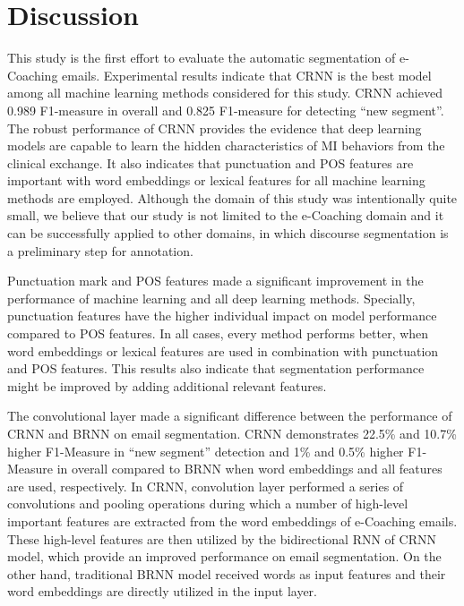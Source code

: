 \documentclass{amia}
\begin{document}
\section*{Discussion}
This study is the first effort to evaluate the automatic segmentation of e-Coaching emails. Experimental results indicate that CRNN is the best model among all machine learning methods considered for this study. CRNN achieved 0.989 F1-measure in overall and 0.825 F1-measure for detecting ``new segment''. The robust performance of CRNN provides the evidence that deep learning models are capable to learn the hidden characteristics of MI behaviors from the clinical exchange. It also indicates that punctuation and POS features are important with word embeddings or lexical features for all machine learning methods are employed. Although the domain of this study was intentionally quite small, we believe that our study is not limited to the e-Coaching domain and it can be successfully applied to other domains, in which discourse segmentation is a preliminary step for annotation.

Punctuation mark and POS features made a significant improvement in the performance of machine learning and all deep learning methods. Specially, punctuation features have the higher individual impact on model performance compared to POS features. In all cases, every method performs better, when word embeddings or lexical features are used in combination with punctuation and POS features. This results also indicate that segmentation performance might be improved by adding additional relevant features. 

The convolutional layer made a significant difference between the performance of CRNN and BRNN on email segmentation. CRNN demonstrates 22.5\% and 10.7\% higher F1-Measure in ``new segment'' detection and 1\% and 0.5\% higher F1-Measure in overall compared to BRNN when word embeddings and all features are used, respectively. In CRNN, convolution layer performed a series of convolutions and pooling operations during which a number of high-level important features are extracted from the word embeddings of e-Coaching emails. These high-level features are then utilized by the bidirectional RNN of CRNN model, which provide an improved performance on email segmentation. On the other hand, traditional BRNN model received words as input features and their word embeddings are directly utilized in the input layer.  
\end{document}
